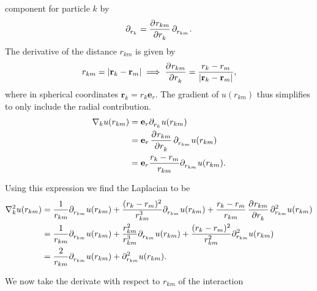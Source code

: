 \documentclass[
    a4paper, aps, twocolumn, floatfix, superscriptaddress]{revtex4-1}
\newcommand{\vf}{\mathbf}
\newcommand{\1}{\mathds{1}}
\newcommand{\tpl}[1]{\tensor{\partial}{_#1}} %
\begin{document}
            component for particle $k$ by
            \begin{align}
                \tpl{{r_k}}
                = \dpd[]{r_{km}}{r_k}\tpl{{r_{km}}}.
            \end{align}
            The derivative of the distance $r_{km}$ is given by
            \begin{gather}
                r_{km} = |\vf{r}_k - \vf{r}_m|
                \implies
                \dpd[]{r_{km}}{r_k}
                = \frac{r_k - r_m}{|\vf{r}_k - \vf{r}_m|},
            \end{gather}
            where in spherical coordinates $\vf{r}_k = r_k\vf{e}_r$.  The
            gradient of $u(r_{km})$ thus simplifies to only include the radial
            contribution.
            \begin{align}
                \nabla_k u(r_{km})
                &=
                \vf{e}_{r}\tpl{{r_k}}u(r_{km})
                \\
                &=
                \vf{e}_r\dpd[]{r_{km}}{r_k}\tpl{{r_{km}}}u(r_{km})
                \\
                &= \vf{e}_r\frac{r_k - r_m}{r_{km}}
                \tpl{{r_{km}}}u(r_{km}).
            \end{align}
            \begin{widetext}
                Using this expression we find the Laplacian to be
                \begin{align}
                    \nabla_k^2 u(r_{km})
                    &=
                    \frac{1}{r_{km}} \tpl{{r_{km}}} u(r_{km})
                    + \frac{(r_k - r_m)^2}{r_{km}^3} \tpl{{r_{km}}} u(r_{km})
                    +
                    \frac{r_k - r_m}{r_{km}}
                    \dpd[]{r_{km}}{r_k}
                    \partial_{{r_{km}}}^2 u(r_{km}) \\
                    &=
                    \frac{1}{r_{km}} \tpl{{r_{km}}} u(r_{km})
                    + \frac{r_{km}^2}{r_{km}^3} \tpl{{r_{km}}} u(r_{km})
                    +
                    \frac{(r_k - r_m)^2}{r_{km}^2}
                    \partial_{{r_{km}}}^2 u(r_{km}) \\
                    &=
                    \frac{2}{r_{km}}\tpl{{r_{km}}}u(r_{km})
                    + \partial_{{r_{km}}}^2u(r_{km}).
                \end{align}
            \end{widetext}
            We now take the derivate with respect to $r_{km}$ of the interaction
\end{document}
